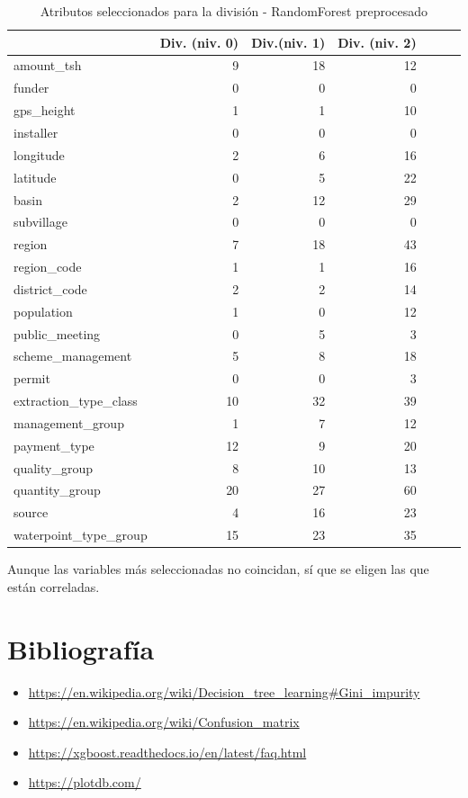 \documentclass[a4paper, 20pt]{article}
\begin{document}
\begin{table}[H]
\centering
\caption{Atributos seleccionados para la división - RandomForest preprocesado}
\label{tab:RFatrib2}
\begin{tabular}{lrrrrrr}
\toprule
 & Div. (niv. 0) & Div.(niv. 1) & Div. (niv. 2) \\ \midrule
amount\_tsh & 9 & 18 & 12 \\
funder & 0 & 0 & 0 \\
gps\_height & 1 & 1 & 10 \\
installer & 0 & 0 & 0 \\
longitude & 2 & 6 & 16 \\
latitude & 0 & 5 & 22 \\
basin & 2 & 12 & 29 \\
subvillage & 0 & 0 & 0 \\
region & 7 & 18 & 43 \\
region\_code & 1 & 1 & 16 \\
district\_code & 2 & 2 & 14 \\
population & 1 & 0 & 12 \\
public\_meeting & 0 & 5 & 3 \\
scheme\_management & 5 & 8 & 18 \\
permit & 0 & 0 & 3 \\
extraction\_type\_class & 10 & 32 & 39 \\
management\_group & 1 & 7 & 12 \\
payment\_type & 12 & 9 & 20 \\
quality\_group & 8 & 10 & 13 \\
quantity\_group & 20 & 27 & 60 \\
source & 4 & 16 & 23 \\
waterpoint\_type\_group & 15 & 23 & 35 \\
\bottomrule
\end{tabular}
\end{table}

Aunque las variables más seleccionadas no coincidan, sí que se eligen las que están correladas.

\section{Bibliografía}
\begin{itemize}
\item \url{https://en.wikipedia.org/wiki/Decision_tree_learning#Gini_impurity}
\item \url{https://en.wikipedia.org/wiki/Confusion_matrix}
\item \url{https://xgboost.readthedocs.io/en/latest/faq.html}\label{ref:XGB}
  \item \url{https://plotdb.com/}
\end{itemize}
\end{document}
